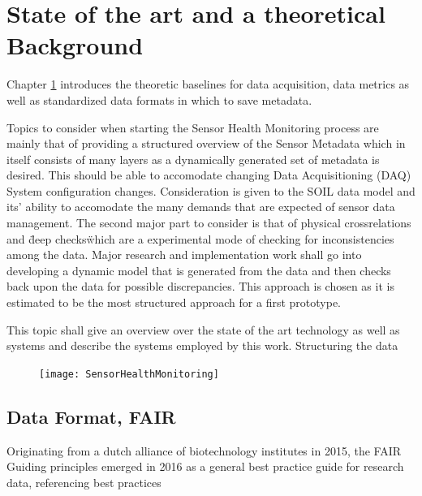 

\chapter{State of the art and a theoretical Background}
\label{chap:2}









Chapter \ref{chap:2} introduces the theoretic baselines for data acquisition, data metrics as well as standardized data formats in which to save metadata.



Topics to consider when starting the Sensor Health Monitoring process are mainly that of providing a structured overview of the Sensor Metadata which in itself consists of many layers as a dynamically generated set of metadata is desired. This should be able to accomodate changing Data Acquisitioning (DAQ) System configuration changes.
Consideration is given to the SOIL data model and its' ability to accomodate the many demands that are expected of
sensor data management. \cite{behrens_domain-specific_2021}
The second major part to consider is that of physical crossrelations and \"deep checks\" which are a experimental mode of checking for inconsistencies among the data.
Major research and implementation work shall go into developing a dynamic model that is generated from the data and then checks back upon the data for possible discrepancies. This approach is chosen as it is estimated to be the most structured approach for a first prototype.


This topic shall give an overview over the state of the art technology as well as systems and describe the systems employed by this work. Structuring the data



\begin{figure}[h]
    \centering
    \texttt{[image: SensorHealthMonitoring]}
    \caption{}
    \label{fig:shm}
\end{figure}


\section{Data Format, FAIR}

Originating from a dutch alliance of biotechnology institutes in 2015, the FAIR Guiding principles emerged in 2016 as a general best practice guide for research data, referencing best practices

